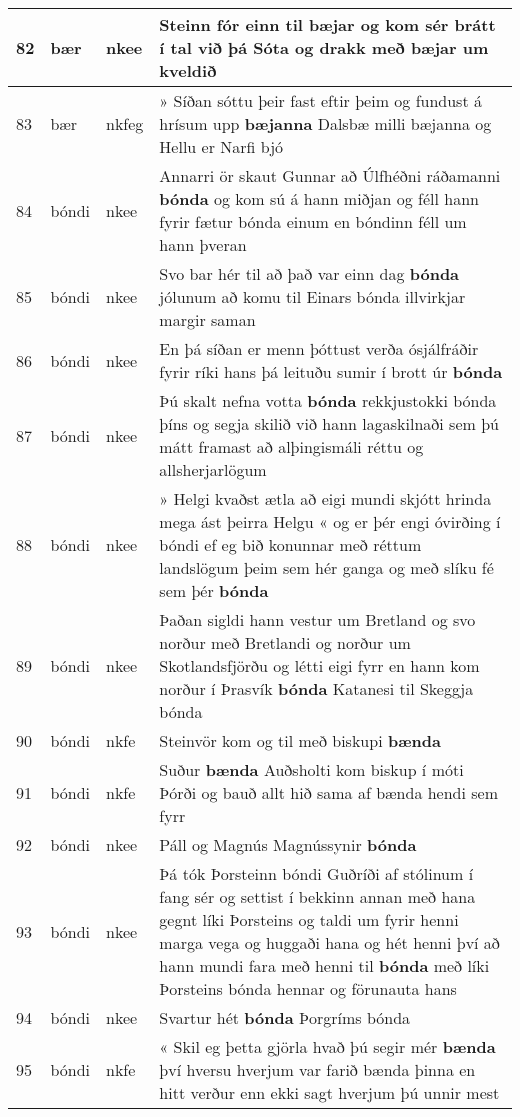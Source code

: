 \documentclass{article}
\begin{document}
\begin{longtable}{p{1cm}|p{1cm}|p{1cm}|p{13cm}}
\hline
82&bær&nkee&Steinn fór einn til bæjar og kom sér brátt í tal við þá Sóta og drakk með \textbf{bæjar} um kveldið\\
\hline
83&bær&nkfeg&» Síðan sóttu þeir fast eftir þeim og fundust á hrísum upp \textbf{bæjanna} Dalsbæ milli bæjanna og Hellu er Narfi bjó\\
\hline
84&bóndi&nkee&Annarri ör skaut Gunnar að Úlfhéðni ráðamanni \textbf{bónda} og kom sú á hann miðjan og féll hann fyrir fætur bónda einum en bóndinn féll um hann þveran\\
\hline
85&bóndi&nkee&Svo bar hér til að það var einn dag \textbf{bónda} jólunum að komu til Einars bónda illvirkjar margir saman\\
\hline
86&bóndi&nkee&En þá síðan er menn þóttust verða ósjálfráðir fyrir ríki hans þá leituðu sumir í brott úr \textbf{bónda} \\
\hline
87&bóndi&nkee&Þú skalt nefna votta \textbf{bónda} rekkjustokki bónda þíns og segja skilið við hann lagaskilnaði sem þú mátt framast að alþingismáli réttu og allsherjarlögum\\
\hline
88&bóndi&nkee&» Helgi kvaðst ætla að eigi mundi skjótt hrinda mega ást þeirra Helgu « og er þér engi óvirðing í bóndi ef eg bið konunnar með réttum landslögum þeim sem hér ganga og með slíku fé sem þér \textbf{bónda} \\
\hline
89&bóndi&nkee&Þaðan sigldi hann vestur um Bretland og svo norður með Bretlandi og norður um Skotlandsfjörðu og létti eigi fyrr en hann kom norður í Þrasvík \textbf{bónda} Katanesi til Skeggja bónda\\
\hline
90&bóndi&nkfe&Steinvör kom og til með biskupi \textbf{bænda} \\
\hline
91&bóndi&nkfe&Suður \textbf{bænda} Auðsholti kom biskup í móti Þórði og bauð allt hið sama af bænda hendi sem fyrr\\
\hline
92&bóndi&nkee&Páll og Magnús Magnússynir \textbf{bónda} \\
\hline
93&bóndi&nkee&Þá tók Þorsteinn bóndi Guðríði af stólinum í fang sér og settist í bekkinn annan með hana gegnt líki Þorsteins og taldi um fyrir henni marga vega og huggaði hana og hét henni því að hann mundi fara með henni til \textbf{bónda} með líki Þorsteins bónda hennar og förunauta hans\\
\hline
94&bóndi&nkee&Svartur hét \textbf{bónda} Þorgríms bónda\\
\hline
95&bóndi&nkfe&« Skil eg þetta gjörla hvað þú segir mér \textbf{bænda} því hversu hverjum var farið bænda þinna en hitt verður enn ekki sagt hverjum þú unnir mest\\

\end{longtable}
\end{document}
